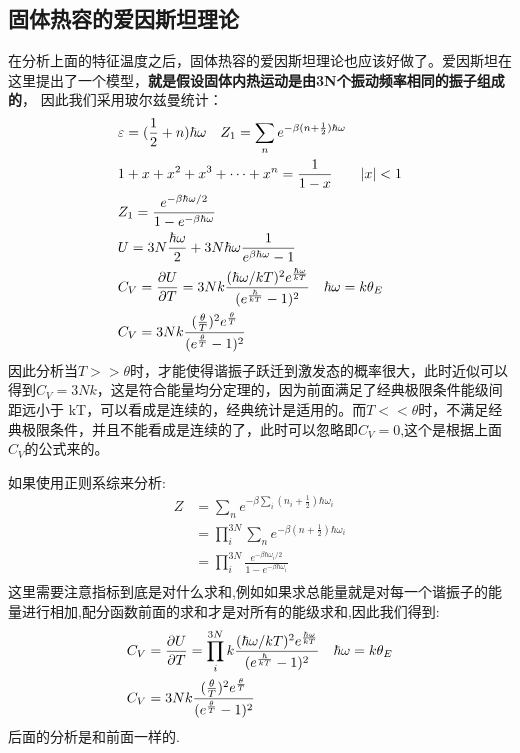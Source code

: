 \documentclass[UTF8]{ctexart}
\begin{document}
\subsection{固体热容的爱因斯坦理论}
在分析上面的特征温度之后，固体热容的爱因斯坦理论也应该好做了。爱因斯坦在这里提出了一个模型，\textbf{就是假设固体内热运动是由3N个振动频率相同的振子组成的}，
因此我们采用玻尔兹曼统计：
\begin{align*}
         & \varepsilon = (\frac{1}{2}+n)\hbar \omega \quad Z_1 = \sum_n e^{-\beta (n+\frac{1}{2})\hbar \omega}                          \\
         & 1+x+x^2+x^3+\cdots+x^n=\frac{1}{1-x} \quad \quad  |x|<1                                                                      \\
         & Z_1=\frac{e^{-\beta \hbar\omega/2}}{1-e^{-\beta \hbar \omega}}                                                               \\
         & U = 3N\frac{\hbar \omega}{2}+3N\hbar \omega \frac{1}{e^{\beta\hbar \omega}-1}                                                \\
         & C_V=\pdv{U}{T}=3Nk\frac{(\hbar\omega/kT)^2e^{\frac{\hbar\omega}{kT}}}{(e^{\frac{\hbar}{kT}}-1)^2} \quad\hbar\omega=k\theta_E \\
         & C_V=3Nk\frac{(\frac{\theta}{T})^2 e^{\frac{\theta}{T}}}{(e^\frac{\theta}{T}-1)^2}
\end{align*}
因此分析当$T>>\theta$时，才能使得谐振子跃迁到激发态的概率很大，此时近似可以得到$C_V=3Nk$，这是符合能量均分定理的，因为前面满足了经典极限条件能级间距远小于
kT，可以看成是连续的，经典统计是适用的。而$T<<\theta$时，不满足经典极限条件，并且不能看成是连续的了，此时可以忽略即$C_V=0$,这个是根据上面$C_V$的公式来的。

如果使用正则系综来分析:
\begin{align*}
        Z & =\sum_n e^{-\beta \sum_i (n_i+\frac{1}{2})\hbar\omega_i}                     \\
          & =\prod_i^{3N}\sum_ne^{-\beta(n+\frac{1}{2})\hbar \omega_i}                   \\
          & =\prod_i^{3N} \frac{e^{-\beta \hbar\omega_i/2}}{1-e^{-\beta \hbar \omega_i}} \\
\end{align*}
这里需要注意指标到底是对什么求和,例如如果求总能量就是对每一个谐振子的能量进行相加,配分函数前面的求和才是对所有的能级求和,因此我们得到:
\begin{align*}
         & C_V=\pdv{U}{T}=\prod_i^{3N}k\frac{(\hbar\omega/kT)^2e^{\frac{\hbar\omega}{kT}}}{(e^{\frac{\hbar}{kT}}-1)^2} \quad\hbar\omega=k\theta_E
        \\& C_V=3Nk\frac{(\frac{\theta}{T})^2 e^{\frac{\theta}{T}}}{(e^\frac{\theta}{T}-1)^2}
\end{align*}
后面的分析是和前面一样的.
\end{document}

